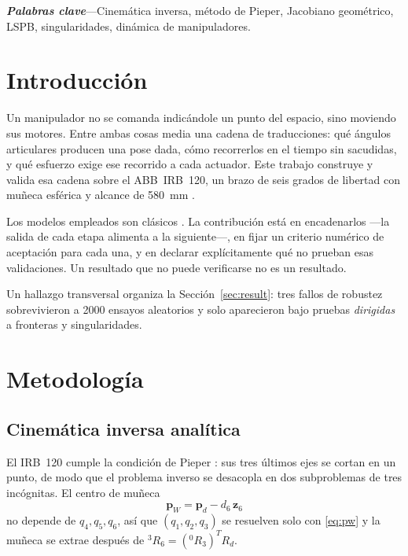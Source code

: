 \documentclass[conference]{IEEEtran}
\begin{document}
\vspace{0.4em}
\noindent\textbf{\textit{Palabras clave}}---Cinemática inversa, método
de Pieper, Jacobiano geométrico, LSPB, singularidades, dinámica de
manipuladores.

\section{Introducción}

Un manipulador no se comanda indicándole un punto del espacio, sino
moviendo sus motores. Entre ambas cosas media una cadena de
traducciones: qué ángulos articulares producen una pose dada, cómo
recorrerlos en el tiempo sin sacudidas, y qué esfuerzo exige ese
recorrido a cada actuador. Este trabajo construye y valida esa cadena
sobre el ABB~IRB~120, un brazo de seis grados de libertad con muñeca
esférica y alcance de 580~mm \cite{b5}.

Los modelos empleados son clásicos \cite{b1,b2}. La contribución está
en encadenarlos ---la salida de cada etapa alimenta a la siguiente---,
en fijar un criterio numérico de aceptación para cada una, y en
declarar explícitamente qué no prueban esas validaciones. Un resultado
que no puede verificarse no es un resultado.

Un hallazgo transversal organiza la Sección~\ref{sec:result}: tres
fallos de robustez sobrevivieron a 2000 ensayos aleatorios y solo
aparecieron bajo pruebas \emph{dirigidas} a fronteras y singularidades.

\section{Metodología}

\subsection{Cinemática inversa analítica}

El IRB~120 cumple la condición de Pieper \cite{b3}: sus tres últimos
ejes se cortan en un punto, de modo que el problema inverso se desacopla
en dos subproblemas de tres incógnitas. El centro de muñeca
\begin{equation}
    \bm{p}_W = \bm{p}_d - d_6\,\bm{z}_6
    \label{eq:pw}
\end{equation}
no depende de $q_4,q_5,q_6$, así que $(q_1,q_2,q_3)$ se resuelven solo
con \eqref{eq:pw} y la muñeca se extrae después de
${}^{3}R_6 = ({}^{0}R_3)^{T}R_d$.
\end{document}
